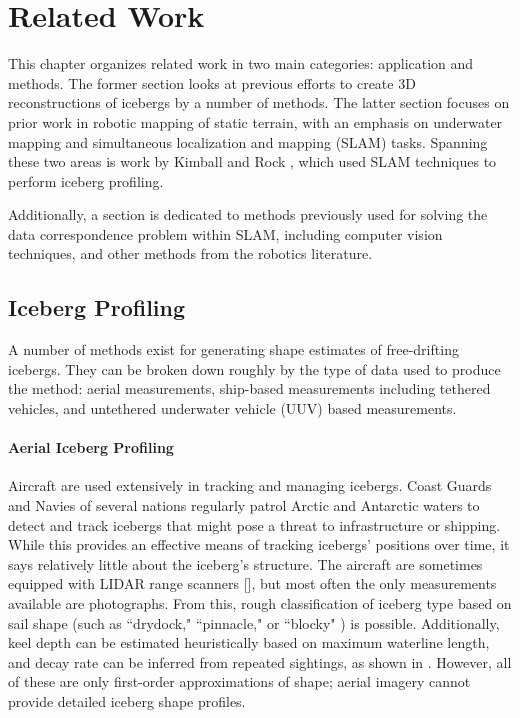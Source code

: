 
\chapter{Related Work}
\label{ch.RelatedWork}

This chapter organizes related work in two main categories: application and methods. The former section looks at previous efforts to create 3D reconstructions of icebergs by a number of methods. The latter section focuses on prior work in robotic mapping of static terrain, with an emphasis on underwater mapping and simultaneous localization and mapping (SLAM) tasks. Spanning these two areas is work by Kimball and Rock \cite{Kimball2011}, which used SLAM techniques to perform iceberg profiling.

Additionally, a section is dedicated to methods previously used for solving the data correspondence problem within SLAM, including computer vision techniques, and other methods from the robotics literature.

\section{Iceberg Profiling}

A number of methods exist for generating shape estimates of free-drifting icebergs. They can be broken down roughly by the type of data used to produce the method: aerial measurements, ship-based measurements including tethered vehicles, and untethered underwater vehicle (UUV) based measurements.

\subsubsection{Aerial Iceberg Profiling}

Aircraft are used extensively in tracking and managing icebergs. Coast Guards and Navies of several nations regularly patrol Arctic and Antarctic waters to detect and track icebergs that might pose a threat to infrastructure or shipping. While this provides an effective means of tracking icebergs' positions over time, it says relatively little about the iceberg's structure. The aircraft are sometimes equipped with LIDAR range scanners [\cite{?}], but most often the only measurements available are photographs. From this, rough classification of iceberg type based on sail shape (such as ``drydock," ``pinnacle," or ``blocky" ) is possible. Additionally, keel depth can be estimated heuristically based on maximum waterline length, and decay rate can be inferred from repeated sightings, as shown in \cite{Barker2004}. However, all of these are only first-order approximations of shape; aerial imagery cannot provide detailed iceberg shape profiles. 

